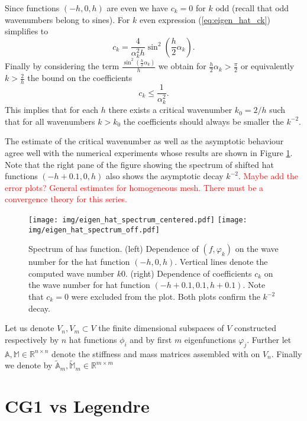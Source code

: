 \documentclass[a4paper,10pt]{article}
\newcommand{\R}{\ensuremath{\mathbb{R}}}
\newcommand{\inner}[2]{\ensuremath{\left(#1, #2\right)}}
\newcommand{\Amat}{\ensuremath{\mathbb{A}}}
\newcommand{\Mmat}{\ensuremath{\mathbb{M}}}
\newcommand{\Ammatt}{\ensuremath{\tilde{\mathbb{A}}_m}}              %
\newcommand{\Mmmatt}{\ensuremath{\tilde{\mathbb{M}}_m}}              %
\newcommand{\TODO}[1]{\textcolor{red}{#1}}
\begin{document}
  Since functions $(-h, 0, h)$ are even we have $c_k=0$ for $k$ odd (recall that
  odd wavenumbers belong to sines). For $k$ even expression
  (\ref{eq:eigen_hat_ck}) simplifies to
  \[
    c_k = \frac{4}{\alpha_k^2 h}\sin^2\left(\frac{h}{2}\alpha_k\right).
  \]
  Finally by considering the term
  $\frac{\sin^2\left(\frac{h}{2}\alpha_k\right)}{h}$
  we obtain for $\frac{h}{2}\alpha_k > \frac{\pi}{2}$ or equivalently 
  $k>\tfrac{2}{h}$ the bound on the coefficients
  \[
    c_k \leq \frac{1}{\alpha_k^2}.
  \]
  This implies that for each $h$ there exists a critical wavenumber $k_0=2/h$
  such that for all wavenumbers $k>k_0$ the coefficients should always be 
  smaller the $k^{-2}$.

  The estimate of the critical wavenumber as well as the asymptotic behaviour
  agree well with the numerical experiments whose results are shown in Figure
  \ref{fig:eig_hat_spectrum}. Note that the right pane of the figure showing
  the spectrum of shifted hat functions $(-h+0.1, 0, h)$ also shows the
  asymptotic decay $k^{-2}$.
  \TODO{Maybe add the error plots?}
  \TODO{General estimates for homogeneous mesh.}
  \TODO{There must be a convergence theory for this series.}

  \begin{figure}
  \begin{center}
    \texttt{[image: img/eigen\_hat\_spectrum\_centered.pdf]}
    \texttt{[image: img/eigen\_hat\_spectrum\_off.pdf]}
  \end{center}
  \label{fig:eig_hat_spectrum}
  \caption{Spectrum of has function. (left) Dependence of $\inner{f}{\varphi_k}$
    on the wave number for the hat function $(-h, 0, h)$. Vertical lines denote
    the computed wave number $k0$. (right) Dependence of coefficients $c_k$ on
    the wave number for hat function $(-h+0.1, 0.1, h+0.1)$. Note that $c_k=0$
    were excluded from the plot. Both plots confirm the $k^{-2}$ decay.}
  \end{figure}

  Let us denote $V_n, V_m\subset V$ the finite dimensional subspaces of $V$
  constructed respectively by $n$ hat functions $\phi_i$ and by first $m$
  eigenfunctions $\varphi_j$. Further let $\Amat, \Mmat \in \R^{n \times n}$ denote
  the stiffness and mass matrices assembled with on $V_n$. Finally we denote
  by $\Ammatt, \Mmmatt \in \R^{m\times m}$

  \section{CG1 vs Legendre}

  
  
\end{document}
